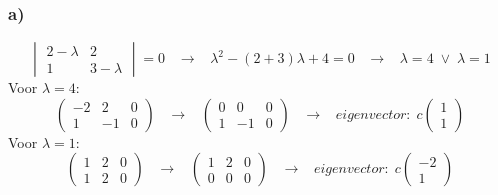 \documentclass[11pt]{article}
\begin{document}
\subsubsection*{a)}
\[
\begin{vmatrix}
2-\lambda & 2 \\
1 & 3-\lambda
\end{vmatrix}
=0
\;\;\;\longrightarrow\;\;\;
\lambda^2 - (2+3)\lambda +4 = 0
\;\;\;\longrightarrow\;\;\;
\lambda = 4 \;\vee\; \lambda = 1
\]
Voor $\lambda = 4$: 
\[
\left(
\begin{array}{cc|c}
-2 & 2 & 0 \\
1 & -1 & 0
\end{array}
\right)
\;\;\;\longrightarrow\;\;\;
\left(
\begin{array}{cc|c}
0 & 0 & 0 \\
1 & -1 & 0
\end{array}
\right)
\;\;\;\longrightarrow\;\;\;
eigenvector:\;
c
\begin{pmatrix}
1\\1
\end{pmatrix}
\]
Voor $\lambda = 1$: 
\[
\left(
\begin{array}{cc|c}
1 & 2 & 0 \\
1 & 2 & 0
\end{array}
\right)
\;\;\;\longrightarrow\;\;\;
\left(
\begin{array}{cc|c}
1 & 2 & 0 \\
0 & 0 & 0
\end{array}
\right)
\;\;\;\longrightarrow\;\;\;
eigenvector:\;
c
\begin{pmatrix}
-2\\1
\end{pmatrix}
\]
\end{document}
